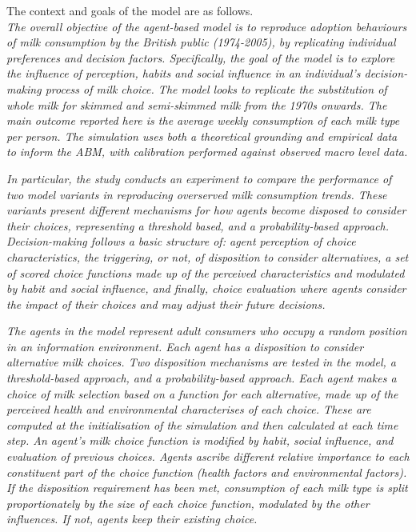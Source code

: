 \documentclass[preprint,12pt]{elsarticle}
\begin{document}
\begin{tcolorbox}
The context and goals of the model are as follows.\\

\textit{The overall objective of the agent-based model is to reproduce adoption behaviours of milk consumption by the British public (1974-2005), by replicating individual preferences and decision factors. Specifically, the goal of the model is to explore the influence of perception, habits and social influence in an individual’s decision-making process of milk choice. The model looks to replicate the substitution of whole milk for skimmed and semi-skimmed milk from the 1970s onwards. The main outcome reported here is the average weekly consumption of each milk type per person. The simulation uses both a theoretical grounding and empirical data to inform the ABM, with calibration performed against observed macro level data.}

\textit{In particular, the study conducts an experiment to compare the performance of two model variants in reproducing overserved milk consumption trends. These variants present different mechanisms for how agents become disposed to consider their choices, representing a threshold based, and a probability-based approach.
Decision-making follows a basic structure of: agent perception of choice characteristics, the triggering, or not, of disposition to consider alternatives, a set of scored choice functions made up of the perceived characteristics and modulated by habit and social influence, and finally, choice evaluation where agents consider the impact of their choices and may adjust their future decisions.}

\textit{The agents in the model represent adult consumers who occupy a random position in an information environment. Each agent has a disposition to consider alternative milk choices. Two disposition mechanisms are tested in the model, a threshold-based approach, and a probability-based approach. Each agent makes a choice of milk selection based on a function for each alternative, made up of the perceived health and environmental characterises of each choice. These are computed at the initialisation of the simulation and then calculated at each time step. An agent’s milk choice function is modified by habit, social influence, and evaluation of previous choices. Agents ascribe different relative importance to each constituent part of the choice function (health factors and environmental factors). If the disposition requirement has been met, consumption of each milk type is split proportionately by the size of each choice function, modulated by the other influences. If not, agents keep their existing choice.}


\end{tcolorbox}
\end{document}
